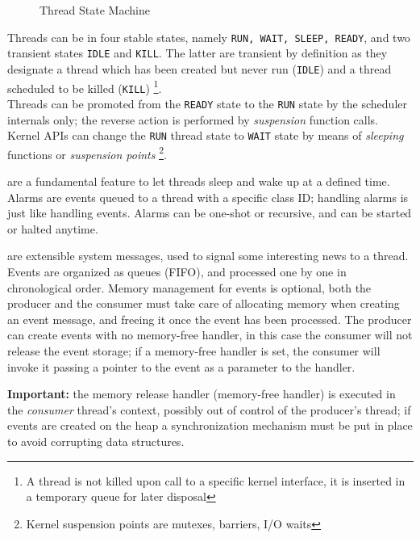 \documentclass[11pt,b5paper]{scrbook}
\begin{document}
\begin{description}
\begin{figure}
\caption{Thread State Machine }
\label{fig:tikz-threadstatemachine}
\end{figure}

Threads can be in four stable states, namely \texttt{RUN, WAIT, SLEEP,  READY}, and two transient states
 \texttt{IDLE} and \texttt{KILL}.
The latter are transient by definition as they designate a thread which has been created but never run (\texttt{IDLE})
and a thread scheduled to be killed (\texttt{KILL})
\footnote{A thread is not killed upon call to a specific kernel interface, it is inserted in a temporary queue for later disposal}.\\
Threads can be promoted from the \texttt{READY} state to the \texttt{RUN} state  by the scheduler internals only;  the reverse action is performed by \textit{suspension} function calls.\\
Kernel APIs can change the \texttt{RUN} thread state to \texttt{WAIT} state by means of \textit{sleeping} functions or \textit{suspension points}
\footnote{Kernel suspension points are mutexes, barriers, I/O waits}.

\item[Alarms] are a fundamental feature to let threads sleep and wake up at a
defined time. 
Alarms are events queued to a thread with a specific class ID; handling alarms is just
like handling events. Alarms can be one-shot or recursive, and can be started or
halted anytime.
\item[Events] are extensible system messages, used to signal some interesting news to a thread. 
Events are organized as queues (FIFO), and processed one by one in
chronological order.
Memory management for events is optional,  both the producer and the
consumer must take care of allocating memory when creating an event message,
and freeing it once the event has been processed. The producer can create events
with no memory-free handler, in this case the consumer will not release the event storage;
if a memory-free handler is set, the consumer will invoke it passing a pointer to the event
as a parameter to the handler.

\begin{warning}
\textbf{Important:} the memory release handler (memory-free handler) is executed in
the \textit{consumer} thread's context, possibly out of control of the producer's thread;
if events are created on the heap a synchronization mechanism must be put in place to
avoid corrupting data structures.
\end{warning}


\end{description}
\end{document}
